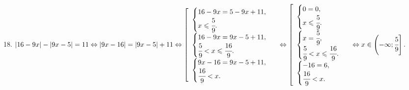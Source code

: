 18. $|16-9x|-|9x-5|=11\Leftrightarrow|9x-16|=|9x-5|+11\Leftrightarrow \left[\begin{array}{l}\begin{cases} 16-9x=5-9x+11,\\ x\leqslant\cfrac{5}{9}.\end{cases}\\
\begin{cases} 16-9x=9x-5+11,\\ \cfrac{5}{9}<x\leqslant\cfrac{16}{9}.\end{cases}\\ \begin{cases} 9x-16=9x-5+11,\\ \cfrac{16}{9}<x.\end{cases}\end{array}\right.\Leftrightarrow \left[\begin{array}{l}\begin{cases} 0=0,\\ x\leqslant\cfrac{5}{9}.\end{cases}\\
\begin{cases} x=\cfrac{5}{9},\\ \cfrac{5}{9}<x\leqslant\cfrac{16}{9}.\end{cases}\\ \begin{cases} -16=6,\\ \cfrac{16}{9}<x.\end{cases}\end{array}\right.
\Leftrightarrow x\in \left(-\infty;\cfrac{5}{9}\right].$\\
